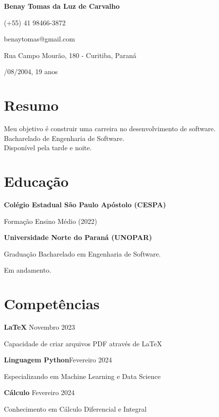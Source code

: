 \documentclass[12pt]{article}
\newcommand{\cvsection}[1]{\section*{\rmfamily#1}}
\begin{document}
\begin{center}
    \Huge{
    \rmfamily
    \textbf{Benay Tomas da Luz de Carvalho}}
\end{center}
\vspace{5pt}


\setlength{\parskip}{1pt}
\renewcommand{\arraystretch}{1.25}


\begin{center}

{\large

\noindent (+55) 41 98466-3872

\noindent benaytomas@gmail.com

\noindent Rua Campo Mourão, 180 - Curitiba, Paraná

/08/2004, 19 anos

}

\end{center}

\setlength{\parskip}{3pt}

\cvsection{Resumo}

\indent
{\large

Meu objetivo é construir uma carreira no desenvolvimento de software.\\
\indent Bacharelado de Engenharia de Software.\\
\indent Disponível pela tarde e noite.

}

\cvsection{Educação}
\indent 
{\large

\textbf{Colégio Estadual São Paulo Apóstolo (CESPA)}

\hspace{2em}Formação Ensino Médio (2022)

\textbf{Universidade Norte do Paraná (UNOPAR)}

\hspace{2em}Graduação Bacharelado em Engenharia de Software.

\hspace{2em}Em andamento.
}

\vspace*{.15cm}
\cvsection{Competências}
\noindent

{\large

\textbf{LaTeX} \hfill Novembro 2023

\hspace{2em}Capacidade de criar arquivos PDF através de LaTeX

\textbf{Linguagem Python}\hfill Fevereiro 2024

\indent
\hspace{2em}Especializando em Machine Learning e Data Science

\textbf{Cálculo} \hfill Fevereiro 2024

\hspace{2em}Conhecimento em Cálculo Diferencial e Integral

}
\end{document}
